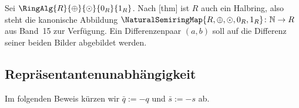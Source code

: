 \documentclass[main.tex]{subfiles}
\begin{document}
Sei \(\RingAlg{R}{\oplus}{\odot}{0_R}{1_R}\). Nach
[thm] ist \(R\) auch ein Halbring,
also steht die kanonische Abbildung
\(\NaturalSemiringMap{R,\oplus,\odot,0_R,1_R}\colon\mathbb N\to R\)
aus Band~15 zur Verfügung. Ein Differenzenpaar \((a,b)\) soll auf die
Differenz seiner beiden Bilder abgebildet werden.

\subsection{Repräsentantenunabhängigkeit}

Im folgenden Beweis kürzen wir
\(\bar q:=-q\) und \(\bar s:=-s\) ab.
\end{document}
